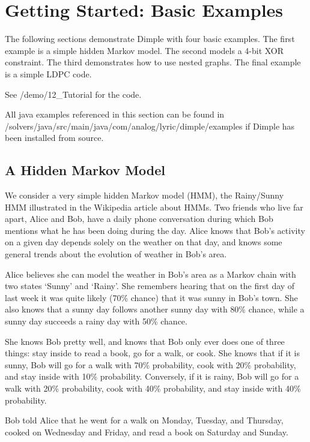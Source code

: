 \section{Getting Started: Basic Examples}

The following sections demonstrate Dimple with four basic examples. The first example is a simple hidden Markov model. The second models a 4-bit XOR constraint. The third demonstrates how to use nested graphs. The final example is a simple LDPC code.  

\ifmatlab
See /demo/12\_Tutorial for the code.  
\fi

\ifjava
All java examples referenced in this section can be found in /solvers/java/src/main/java/com/analog/lyric/dimple/examples if Dimple has been installed from source.
\fi

\subsection{A Hidden Markov Model}

We consider a very simple hidden Markov model (HMM), the Rainy/Sunny HMM illustrated in the Wikipedia article about HMMs. Two friends who live far apart, Alice and Bob, have a daily phone conversation during which Bob mentions what he has been doing during the day. Alice knows that Bob's activity on a given day depends solely on the weather on that day, and knows some general trends about the evolution of weather in Bob's area.

Alice believes she can model the weather in Bob's area as a Markov chain with two states `Sunny' and `Rainy'. She remembers hearing that on the first day of last week it was quite likely (70\% chance) that it was sunny in Bob's town. She also knows that a sunny day follows another sunny day with 80\% chance, while a sunny day succeeds a rainy day with 50\% chance.

She knows Bob pretty well, and knows that Bob only ever does one of three things: stay inside to read a book, go for a walk, or cook. She knows that if it is sunny, Bob will go for a walk with 70\% probability, cook with 20\% probability, and stay inside with 10\% probability. Conversely, if it is rainy, Bob will go for a walk with 20\% probability, cook with 40\% probability, and stay inside with 40\% probability. 

Bob told Alice that he went for a walk on Monday, Tuesday, and Thursday, cooked on Wednesday and Friday, and read a book on Saturday and Sunday.

